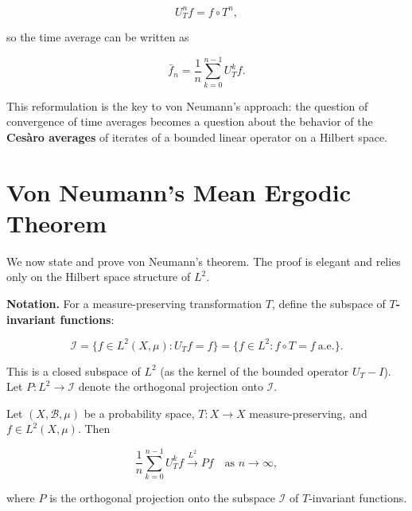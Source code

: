 \[
U_T^n f = f \circ T^n,
\]

so the time average can be written as

\[
\bar{f}_n = \frac{1}{n} \sum_{k=0}^{n-1} U_T^k f.
\]

This reformulation is the key to von Neumann's approach: the question of convergence of time averages becomes a question about the behavior of the \textbf{Cesàro averages} of iterates of a bounded linear operator on a Hilbert space.


\section{Von Neumann's Mean Ergodic Theorem}\label{sec:9.3}

We now state and prove von Neumann's theorem. The proof is elegant and relies only on the Hilbert space structure of $L^2$.

\textbf{Notation.} For a measure-preserving transformation $T$, define the subspace of \textbf{$T$-invariant functions}:

\[
\mathcal{I} = \{ f \in L^2(X, \mu) : U_T f = f \} = \{ f \in L^2 : f \circ T = f \ \text{a.e.} \}.
\]

This is a closed subspace of $L^2$ (as the kernel of the bounded operator $U_T - I$). Let $P: L^2 \to \mathcal{I}$ denote the orthogonal projection onto $\mathcal{I}$.

\begin{theorem}\label{thm:9.3}
Let $(X, \mathcal{B}, \mu)$ be a probability space, $T: X \to X$ measure-preserving, and $f \in L^2(X, \mu)$. Then

\[
\frac{1}{n} \sum_{k=0}^{n-1} U_T^k f \xrightarrow{L^2} Pf \quad \text{as } n \to \infty,
\]

where $P$ is the orthogonal projection onto the subspace $\mathcal{I}$ of $T$-invariant functions.
\end{theorem}


